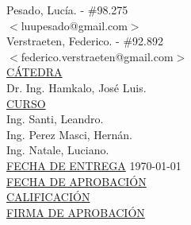 \begin{titlepage}
\begin{tabbing}
		Pesado, Lucía.	\>\>- \#98.275\\
		\>\footnotesize{$<$luupesado@gmail.com$>$}\\
		
		Verstraeten, Federico.	\>\>- \#92.892\\
		\>\footnotesize{$<$federico.verstraeten@gmail.com$>$}\\
		
		\<\underline{CÁTEDRA}\\[0.2cm]
		Dr. Ing. Hamkalo, José Luis. \\
		
		\<\underline{CURSO}\\[0.2cm]
		Ing. Santi, Leandro. \\
		Ing. Perez Masci, Hernán. \\
		Ing. Natale, Luciano. \\[1cm]
		
		\<\underline{FECHA DE ENTREGA}\>\>\> \today
		\\[0.2cm]
		
		\<\underline{FECHA DE APROBACIÓN}\>\>\> 
		\\[0.2cm]
		
		\<\underline{CALIFICACIÓN}\>\>\> 
		\\[0.2cm]
		
		\<\underline{FIRMA DE APROBACIÓN}
		\\[0.5cm]
		
	\end{tabbing}
	
	
	
	
\end{titlepage}

\clearpage

\tableofcontents							

\clearpage



